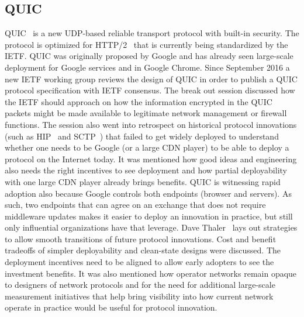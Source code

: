 \subsection{QUIC}

QUIC~\cite{draft-ietf-quic-transport} is a new UDP-based reliable transport
protocol with built-in security. The protocol is optimized for HTTP/2~\cite{rfc7540} that is currently being standardized by the \ac{IETF}. QUIC was
originally proposed by Google and has already seen large-scale deployment for
Google services and in Google Chrome. Since September 2016 a new IETF working
group reviews the design of QUIC in order to publish a QUIC protocol
specification with \ac{IETF} consensus. The break out session discussed how
the \ac{IETF} should approach on how the information encrypted in the QUIC
packets might be made available to legitimate network management or firewall
functions. The session also went into retrospect on historical protocol
innovations (such as HIP~\cite{pnikander:comst:2010} and SCTP~\cite{rfc4960})
that failed to get widely deployed to understand whether one needs to be
Google (or a large CDN player) to be able to deploy a protocol on the Internet
today. It was mentioned how good ideas and engineering also needs the right
incentives to see deployment and how partial deployability with one large CDN
player already brings benefits. QUIC is witnessing rapid adoption also because
Google controls both endpoints (browser and servers). As such, two endpoints
that can agree on an exchange that does not require middleware updates makes
it easier to deploy an innovation in practice, but still only influential
organizations have that leverage. Dave Thaler~\cite{draft-iab-protocol-transitions} lays out strategies to allow smooth
transitions of future protocol innovations. Cost and benefit tradeoffs of
simpler deployability and clean-state designs were discussed. The deployment
incentives need to be aligned to allow early adopters to see the investment
benefits. It was also mentioned how operator networks remain opaque to
designers of network protocols and for the need for additional large-scale
measurement initiatives that help bring visibility into how current network
operate in practice would be useful for protocol innovation.




